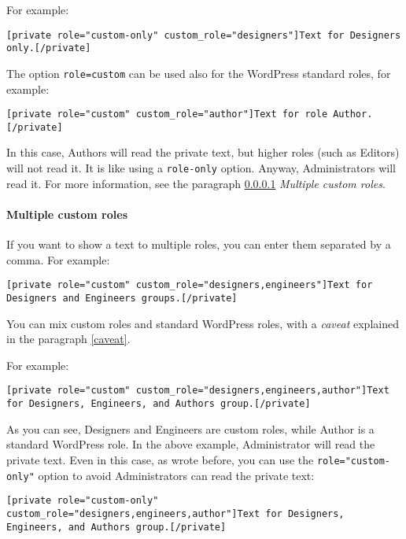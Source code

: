 For example:

\begin{lstlisting}
[private role="custom-only" custom_role="designers"]Text for Designers only.[/private]
\end{lstlisting}


The option \verb+role=custom+ can be used also for the WordPress standard roles,
for example:

\begin{lstlisting}
[private role="custom" custom_role="author"]Text for role Author.[/private]
\end{lstlisting}

In this case, Authors will read the private text, but higher roles (such as
Editors) will not read it. It is like using a \verb+role-only+ option. Anyway,
Administrators will read it. For more information, see the paragraph
\ref{multiple-custom-roles} \textit{Multiple custom roles}.

\paragraph{Multiple custom roles}\label{multiple-custom-roles}

If you want to show a text to multiple roles, you can enter them separated by a
comma. For example:

\begin{lstlisting}
[private role="custom" custom_role="designers,engineers"]Text for Designers and Engineers groups.[/private]
\end{lstlisting}

You can mix custom roles and standard WordPress roles, with a \textit{caveat}
explained in the paragraph \ref{caveat}.

For example:

\begin{lstlisting}
[private role="custom" custom_role="designers,engineers,author"]Text for Designers, Engineers, and Authors group.[/private]
\end{lstlisting}

As you can see, Designers and Engineers are custom roles, while Author is a
standard WordPress role. In the above example, Administrator will read the
private text. Even in this case, as wrote before, you can use the
\verb+role="custom-only"+ option to avoid Administrators can read the private
text:

\begin{lstlisting}
[private role="custom-only" custom_role="designers,engineers,author"]Text for Designers, Engineers, and Authors group.[/private]
\end{lstlisting}

